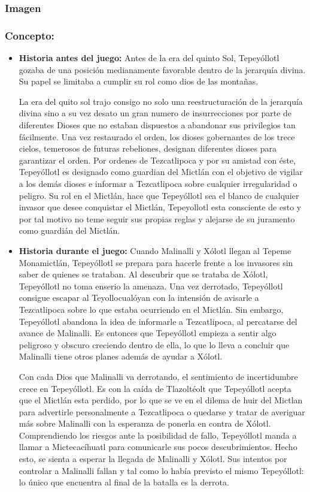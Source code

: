 \documentclass[11pt,letterpaper]{article}
\begin{document}
\subsubsection{Imagen}
\subsubsection{Concepto:}
\begin{itemize}
	\item \textbf{Historia antes del juego:}
	Antes de la era del quinto Sol, Tepeyóllotl gozaba de una posición medianamente favorable dentro de la jerarquía divina. Su papel se limitaba a cumplir su rol como dios de las montañas. 
	\\
	\par
	La era del quito sol trajo consigo no solo una reestructuración de la jerarquía divina sino a su vez desato un gran numero de insurrecciones por parte de diferentes Dioses que no estaban dispuestos a abandonar sus privilegios tan fácilmente. Una vez restaurado el orden, los dioses gobernantes de los trece cielos, temerosos de futuras rebeliones, designan diferentes dioses para garantizar el orden. Por ordenes de Tezcatlipoca y por su amistad con éste, Tepeyóllotl es designado como guardian del Mictlán con el objetivo de vigilar a los demás dioses e informar a Tezcatlipoca sobre cualquier irregularidad o peligro. Su rol en el Mictlán, hace que Tepeyóllotl sea el blanco de cualquier invasor que desee conquistar el Mictlán, Tepeyollotl esta consciente de esto y por tal motivo no teme seguir sus propias reglas y alejarse de su juramento como guardián del Mictlán.   
	\item \textbf{Historia durante el juego:}
	Cuando Malinalli y Xólotl llegan al Tepeme Monamictlán, Tepeyóllotl se prepara para hacerle frente a los invasores sin saber de quienes se trataban. Al descubrir que se trataba de Xólotl, Tepeyóllotl no toma enserio la amenaza. Una vez derrotado, Tepeyóllotl consigue escapar al Teyollocualóyan con la intensión de avisarle a Tezcatlipoca sobre lo que estaba ocurriendo en el Mictlán. Sin embargo, Tepeyóllotl abandona la idea de informarle a Tezcatlipoca, al percatarse del avance de Malinalli. Es entonces que Tepeyóllotl empieza a sentir algo peligroso y obscuro creciendo dentro de ella, lo que lo lleva a concluir que Malinalli tiene otros planes además de ayudar a Xólotl.
	\\
	\par
	Con cada Dios que Malinalli va derrotando, el sentimiento de incertidumbre crece en Tepeyóllotl. Es con la caída de Tlazoltéolt que Tepeyóllotl acepta que el Mictlán esta perdido, por lo que se ve en el dilema de huir del Mictlan para advertirle personalmente a Tezcatlipoca o quedarse y tratar de averiguar más sobre Malinalli con la esperanza de ponerla en contra de Xólotl. Comprendiendo los riesgos ante la posibilidad de fallo, Tepeyóllotl manda a llamar a Mictecacíhuatl para comunicarle sus pocos descubrimientos. Hecho esto, se sienta a esperar la llegada de Malinalli y Xólotl. Sus intentos por controlar a Malinalli fallan y tal como lo había previsto el mismo Tepeyóllotl: lo único que encuentra al final de la batalla es la derrota.  

\end{itemize}
\end{document}
